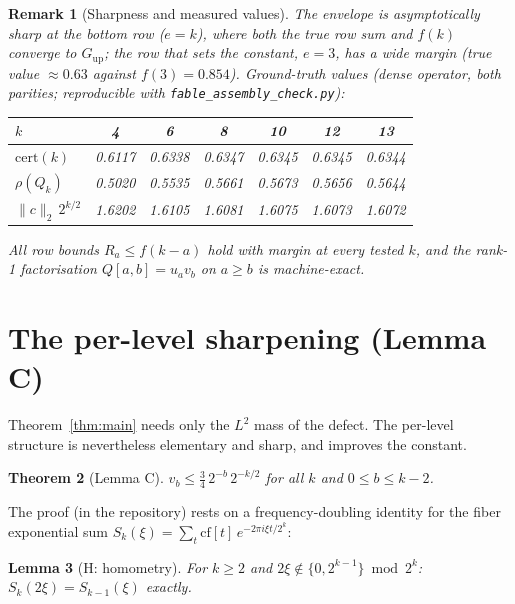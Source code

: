 \documentclass[12pt,a4paper]{article}
\newtheorem{theorem}{Theorem}[section]
\newtheorem{lemma}[theorem]{Lemma}
\newtheorem{remark}[theorem]{Remark}
\newcommand{\cert}{\mathrm{cert}}
\begin{document}
\begin{remark}[Sharpness and measured values]\label{rem:sharp}
The envelope is asymptotically sharp at the bottom row ($e = k$), where both the true row sum and
$f(k)$ converge to $G_{\mathrm{up}}$; the row that sets the constant, $e = 3$, has a wide margin
(true value $\approx 0.63$ against $f(3) = 0.854$). Ground-truth values (dense operator,
both parities; reproducible with \texttt{fable\_assembly\_check.py}):

\begin{center}
\begin{tabular}{lcccccc}
\toprule
$k$ & 4 & 6 & 8 & 10 & 12 & 13 \\
\midrule
$\cert(k)$ & 0.6117 & 0.6338 & 0.6347 & 0.6345 & 0.6345 & 0.6344 \\
$\rho(Q_k)$ & 0.5020 & 0.5535 & 0.5661 & 0.5673 & 0.5656 & 0.5644 \\
$\|c\|_2\, 2^{k/2}$ & 1.6202 & 1.6105 & 1.6081 & 1.6075 & 1.6073 & 1.6072 \\
\bottomrule
\end{tabular}
\end{center}

\noindent All row bounds $R_a \le f(k-a)$ hold with margin at every tested $k$, and the rank-1
factorisation $Q[a,b] = u_a v_b$ on $a \ge b$ is machine-exact.
\end{remark}

\section{The per-level sharpening (Lemma C)}\label{sec:lemmaC}

Theorem~\ref{thm:main} needs only the $L^2$ mass of the defect. The per-level structure is
nevertheless elementary and sharp, and improves the constant.

\begin{theorem}[Lemma C]\label{thm:lemmaC}
$v_b \le \tfrac{3}{4}\, 2^{-b}\, 2^{-k/2}$ for all $k$ and $0 \le b \le k-2$.
\end{theorem}

The proof (in the repository) rests on a frequency-doubling identity for the fiber exponential
sum $S_k(\xi) = \sum_t \mathrm{cf}[t]\, e^{-2\pi i \xi t / 2^k}$:

\begin{lemma}[H: homometry]\label{lem:H}
For $k \ge 2$ and $2\xi \notin \{0, 2^{k-1}\} \bmod 2^k$: $S_k(2\xi) = S_{k-1}(\xi)$ exactly.
\end{lemma}
\end{document}
